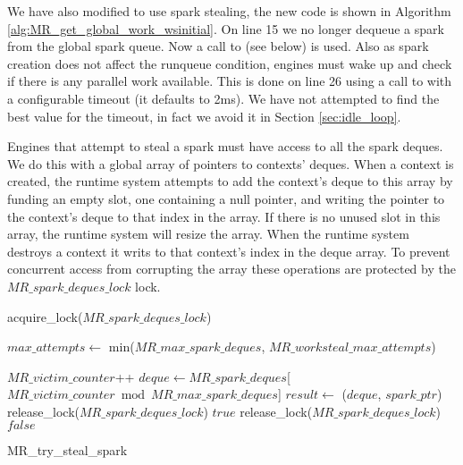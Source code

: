 We have also modified \getglobalwork to use spark stealing,
the new code is shown in Algorithm \ref{alg:MR_get_global_work_wsinitial}.
On line 15 we no longer dequeue a spark from the global spark queue.
Now a call to \trystealspark (see below) is used.
Also as spark creation does not affect the runqueue condition,
engines must wake up and check if there is any parallel work available.
This is done on line 26 using a call to  with a
configurable timeout (it defaults to 2ms).
We have not attempted to find the best value for the timeout,
in fact we avoid it in Section \ref{sec:idle_loop}.

Engines that attempt to steal a spark must have access to all the spark
deques.
We do this with a global array of pointers to contexts' deques.
When a context is created,
the runtime system attempts to add the context's deque to this array by
funding an empty slot,
one containing a null pointer,
and writing the pointer to the context's deque to that index in the array.
If there is no unused slot in this array, the runtime system will resize the
array.
When the runtime system destroys a context it writs \NULL to that context's
index in the deque array.
To prevent concurrent access from corrupting the array these operations are
protected by the $MR\_spark\_deques\_lock$ lock.

\begin{algorithm}
\begin{algorithmic}[1]
  \State acquire\_lock($MR\_spark\_deques\_lock$)

  \State $max\_attempts \gets$ min($MR\_max\_spark\_deques$,
    $MR\_worksteal\_max\_attempts$)

    \State $MR\_victim\_counter$++
    \State $deque \gets
       MR\_spark\_deques$[$MR\_victim\_counter \bmod MR\_max\_spark\_deques$]
      \State $result \gets$ \steal($deque$, $spark\_ptr$)
        \State release\_lock($MR\_spark\_deques\_lock$)
        \State \Return $true$
      \EndIf
    \EndIf
  \EndFor
  \State release\_lock($MR\_spark\_deques\_lock$)
  \State \Return $false$
\EndProcedure
\end{algorithmic}
\caption{MR\_try\_steal\_spark}
\label{alg:try_steal_spark_initial}
\end{algorithm}

